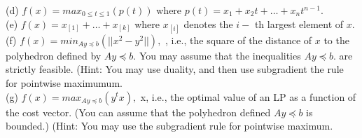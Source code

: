 \documentclass{article}
\begin{document}
 (d) $f(x) = max_{0 \leq t \leq 1}(p(t))$ where 
 $p(t) = x_1 + x_2 t + \dots + x_n t^{n - 1}.$\\
 
 (e) $f(x) = x_{[1]} + \dots + x_{[k]}$ where $x_{[i]}$ 
 denotes the $i-$ th largest element of $x.$ \\
 
 (f) $f(x) = min_{Ay \preceq b}(||x^2 - y^2||),$ 
 , i.e., the square of the distance of $x$ to the polyhedron defined by $Ay \preceq b.$ You may assume that the inequalities $Ay \preceq b.$ are strictly feasible. (Hint: You may use duality, and then use subgradient the rule for pointwise maximumum.  \\
 
 (g) $f(x) = max_{Ay \preceq b}(y^t x),$  x, i.e., the optimal value of an LP as a function of the cost
 vector. (You can assume that the polyhedron defined 
 $Ay \preceq b$ is bounded.)
 (Hint: You may use the subgradient rule for pointwise maximum.
 
 
 
 
\end{document}
